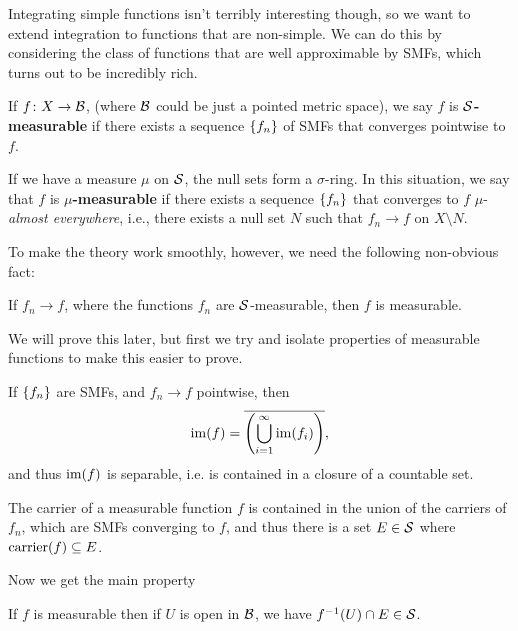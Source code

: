 Integrating simple functions isn't terribly interesting though, so we want to extend integration to functions that are non-simple. We can do this by considering the class of functions that are well approximable by SMFs, which turns out to be incredibly rich.

\begin{definition}
    If $f \colon X \to \mathcal B$, (where $\mathcal B$ could be just a pointed metric space), we say $f$ is \textbf{$\mathcal S$-measurable} if there exists a sequence $\qty{f_n}$ of SMFs that converges pointwise to $f$.

    If we have a measure $\mu$ on $\mathcal S$, the null sets form a $\sigma$-ring. In this situation, we say that $f$ is \textbf{$\mu$-measurable} if there exists a sequence $\qty{f_n}$ that converges to $f$ $\mu$-\emph{almost everywhere}, i.e., there exists a null set $N$ such that $f_n \to f$ on $X \setminus N$.
\end{definition}

To make the theory work smoothly, however, we need the following non-obvious fact:

\begin{proposition}
    If $f_n \to f$, where the functions $f_n$ are $\mathcal S$-measurable, then $f$ is measurable.
\end{proposition}

We will prove this later, but first we try and isolate properties of measurable functions to make this easier to prove.

\begin{proposition}
    If $\qty{f_n}$ are SMFs, and $f_n \to f$ pointwise, then \[\operatorname{im}(f) = \overline{\qty(\bigcup_{i = 1}^\infty \operatorname{im}(f_i))},\] and thus $\operatorname{im}(f)$ is separable, i.e. is contained in a closure of a countable set.
\end{proposition}

\begin{proposition}
    The carrier of a measurable function $f$ is contained in the union of the carriers of $f_n$, which are SMFs converging to $f$, and thus there is a set $E \in \mathcal S$ where $\operatorname{carrier}(f) \subseteq E$.
\end{proposition}

Now we get the main property
\begin{proposition}
    If $f$ is measurable then if $U$ is open in $\mathcal B$, we have $f^{-1}(U) \cap E \in \mathcal S$.
\end{proposition}

